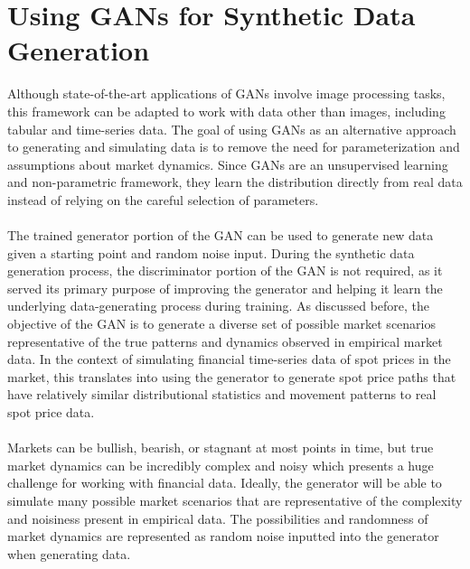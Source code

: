 \section{Using GANs for Synthetic Data Generation}
Although state-of-the-art applications of GANs involve image processing tasks, this framework can be adapted to work with data other than images, including tabular and time-series data. The goal of using GANs as an alternative approach to generating and simulating data is to remove the need for parameterization and assumptions about market dynamics. Since GANs are an unsupervised learning and non-parametric framework, they learn the distribution directly from real data instead of relying on the careful selection of parameters.
\\
\\
The trained generator portion of the GAN can be used to generate new data given a starting point and random noise input. During the synthetic data generation process, the discriminator portion of the GAN is not required, as it served its primary purpose of improving the generator and helping it learn the underlying data-generating process during training. As discussed before, the objective of the GAN is to generate a diverse set of possible market scenarios representative of the true patterns and dynamics observed in empirical market data. In the context of simulating financial time-series data of spot prices in the market, this translates into using the generator to generate spot price paths that have relatively similar distributional statistics and movement patterns to real spot price data.
\\
\\
Markets can be bullish, bearish, or stagnant at most points in time, but true market dynamics can be incredibly complex and noisy which presents a huge challenge for working with financial data. Ideally, the generator will be able to simulate many possible market scenarios that are representative of the complexity and noisiness present in empirical data. The possibilities and randomness of market dynamics are represented as random noise inputted into the generator when generating data.
